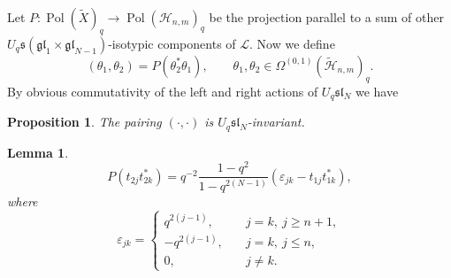 \documentclass[11pt]{article}
\newtheorem{lemma}{Lemma}
\newtheorem{proposition}{Proposition}
\begin{document}
Let $P: \operatorname{Pol}(\widetilde{X})_q \rightarrow \operatorname{Pol}({\mathscr{H}}_{n,m})_q$ be the
projection parallel to a sum of other $U_q \mathfrak{s}(\mathfrak{gl}_1 \times \mathfrak{gl}_{N-1})$-isotypic components of $\mathcal{L}$. Now we def\/ine
\[
(\theta_1,\theta_2)=P(\theta^*_2\theta_1), \qquad \theta_1,\theta_2 \in \Omega^{(0,1)}(\widetilde{\mathscr{H}}_{n,m})_q.
\]
By obvious commutativity of the left and right actions of $U_q \mathfrak{sl}_N$ we have

\begin{proposition}
The pairing $(\cdot,\cdot)$ is $U_q \mathfrak{sl}_N$-invariant.
\end{proposition}
\begin{lemma}
\[P(t_{2j}t^*_{2k})=q^{-2}\frac{1-q^2}{1-q^{2(N-1)}}(\varepsilon_{jk}-t_{1j}t^*_{1k}),\] where
\[
\varepsilon_{jk}=\begin{cases} q^{2(j-1)}, \quad & j=k, \  j \geq n+1, \\
-q^{2(j-1)}, \quad & j=k, \  j \leq n, \\
0, \quad & j \neq k.
\end{cases}
\]
\end{lemma}
\end{document}
